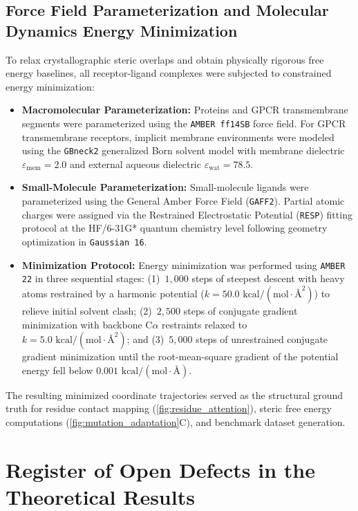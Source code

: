\documentclass{article}
\theoremstyle{definition}
\begin{document}
\subsection{Force Field Parameterization and Molecular Dynamics Energy Minimization}
To relax crystallographic steric overlaps and obtain physically rigorous free energy baselines, all receptor-ligand complexes were subjected to constrained energy minimization:
\begin{itemize}
    \item \textbf{Macromolecular Parameterization:} Proteins and GPCR transmembrane segments were parameterized using the \texttt{AMBER ff14SB} force field. For GPCR transmembrane receptors, implicit membrane environments were modeled using the \texttt{GBneck2} generalized Born solvent model with membrane dielectric $\varepsilon_{\mathrm{mem}} = 2.0$ and external aqueous dielectric $\varepsilon_{\mathrm{wat}} = 78.5$.
    \item \textbf{Small-Molecule Parameterization:} Small-molecule ligands were parameterized using the General Amber Force Field (\texttt{GAFF2}). Partial atomic charges were assigned via the Restrained Electrostatic Potential (\texttt{RESP}) fitting protocol at the HF/6-31G* quantum chemistry level following geometry optimization in \texttt{Gaussian 16}.
    \item \textbf{Minimization Protocol:} Energy minimization was performed using \texttt{AMBER 22} in three sequential stages: (1)~$1,000$ steps of steepest descent with heavy atoms restrained by a harmonic potential ($k = 50.0\text{ kcal}/(\text{mol}\cdot\text{\AA}^2)$) to relieve initial solvent clash; (2)~$2,500$ steps of conjugate gradient minimization with backbone $\text{C}\alpha$ restraints relaxed to $k = 5.0\text{ kcal}/(\text{mol}\cdot\text{\AA}^2)$; and (3)~$5,000$ steps of unrestrained conjugate gradient minimization until the root-mean-square gradient of the potential energy fell below $0.001\text{ kcal}/(\text{mol}\cdot\text{\AA})$.
\end{itemize}
The resulting minimized coordinate trajectories served as the structural ground truth for residue contact mapping (\cref{fig:residue_attention}), steric free energy computations (\cref{fig:mutation_adaptation}C), and benchmark dataset generation.

\section{Register of Open Defects in the Theoretical Results}
\label{sec:theory_defects}
\end{document}
